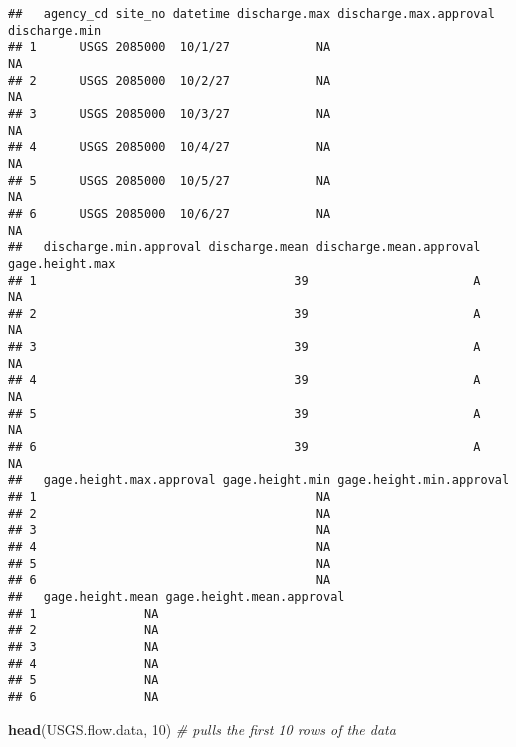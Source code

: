 \documentclass[]{article}
\newenvironment{Shaded}{\begin{snugshade}}{\end{snugshade}}
\newcommand{\CommentTok}[1]{\textcolor[rgb]{0.56,0.35,0.01}{\textit{#1}}}
\newcommand{\DecValTok}[1]{\textcolor[rgb]{0.00,0.00,0.81}{#1}}
\newcommand{\KeywordTok}[1]{\textcolor[rgb]{0.13,0.29,0.53}{\textbf{#1}}}
\newcommand{\NormalTok}[1]{#1}
\begin{document}
\begin{verbatim}
##   agency_cd site_no datetime discharge.max discharge.max.approval discharge.min
## 1      USGS 2085000  10/1/27            NA                                   NA
## 2      USGS 2085000  10/2/27            NA                                   NA
## 3      USGS 2085000  10/3/27            NA                                   NA
## 4      USGS 2085000  10/4/27            NA                                   NA
## 5      USGS 2085000  10/5/27            NA                                   NA
## 6      USGS 2085000  10/6/27            NA                                   NA
##   discharge.min.approval discharge.mean discharge.mean.approval gage.height.max
## 1                                    39                       A              NA
## 2                                    39                       A              NA
## 3                                    39                       A              NA
## 4                                    39                       A              NA
## 5                                    39                       A              NA
## 6                                    39                       A              NA
##   gage.height.max.approval gage.height.min gage.height.min.approval
## 1                                       NA                         
## 2                                       NA                         
## 3                                       NA                         
## 4                                       NA                         
## 5                                       NA                         
## 6                                       NA                         
##   gage.height.mean gage.height.mean.approval
## 1               NA                          
## 2               NA                          
## 3               NA                          
## 4               NA                          
## 5               NA                          
## 6               NA
\end{verbatim}

\begin{Shaded}
\begin{Highlighting}[]
\KeywordTok{head}\NormalTok{(USGS.flow.data, }\DecValTok{10}\NormalTok{) }\CommentTok{# pulls the first 10 rows of the data }
\end{Highlighting}
\end{Shaded}
\end{document}
